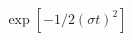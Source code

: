 \documentclass[12pt]{article}
\begin{document}
\begin{displaymath}
\exp\left[-1/2(\sigma t)^2\right]
\end{displaymath}
\end{document}
